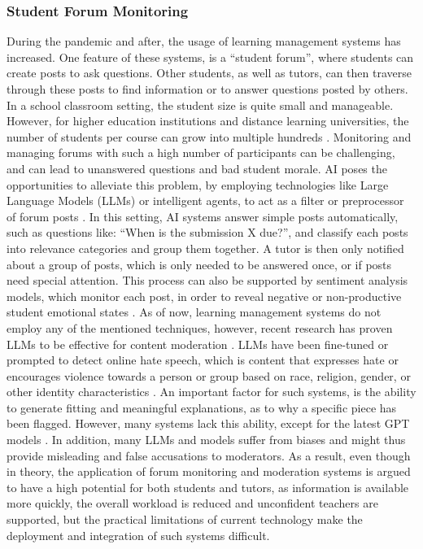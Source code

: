 \documentclass{Academic}
\begin{document}
    \subsubsection{Student Forum Monitoring}
    During the pandemic and after, the usage of learning management systems has increased. One feature of these systems, is a \enquote{student forum}, where students can create posts to ask questions. Other students, as well as tutors, can then traverse through these posts to find information or to answer questions posted by others. In a school classroom setting, the student size is quite small and manageable. However, for higher education institutions and distance learning universities, the number of students per course can grow into multiple hundreds \cite{goel_using_2017}. Monitoring and managing forums with such a high number of participants can be challenging, and can lead to unanswered questions and bad student morale. AI poses the opportunities to alleviate this problem, by employing technologies like Large Language Models (LLMs) or intelligent agents, to act as a filter or preprocessor of forum posts \cite{goel_using_2017,holmes_artificial_2023}. In this setting, AI systems answer simple posts automatically, such as questions like: \enquote{When is the submission X due?}, and classify each posts into relevance categories and group them together. A tutor is then only notified about a group of posts, which is only needed to be answered once, or if posts need special attention. This process can also be supported by sentiment analysis models, which monitor each post, in order to reveal negative or non-productive student emotional states \cite{holmes_artificial_2023}. As of now, learning management systems do not employ any of the mentioned techniques, however, recent research has proven LLMs to be effective for content moderation \cite{wang_evaluating_2023}. LLMs have been fine-tuned or prompted to detect online hate speech, which is content that expresses hate or encourages violence towards a person or group based on race, religion, gender, or other identity characteristics \cite{wang_evaluating_2023}. An important factor for such systems, is the ability to generate fitting and meaningful explanations, as to why a specific piece has been flagged. However, many systems lack this ability, except for the latest GPT models \cite{wang_evaluating_2023}. In addition, many LLMs and models suffer from biases and might thus provide misleading and false accusations to moderators. As a result, even though in theory, the application of forum monitoring and moderation systems is argued to have a high potential for both students and tutors, as information is available more quickly, the overall workload is reduced and unconfident teachers are supported, but the practical limitations of current technology make the deployment and integration of such systems difficult.
\end{document}
